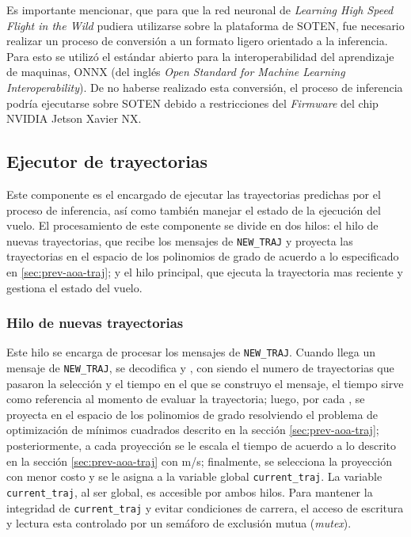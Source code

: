 Es importante mencionar, que para que la red neuronal de \textit{Learning High Speed Flight in the Wild} \cite{Loquercio2021} pudiera utilizarse sobre la plataforma de SOTEN, fue necesario realizar un proceso de conversión a un formato ligero orientado a la inferencia. Para esto se utilizó el estándar abierto para la interoperabilidad del aprendizaje de maquinas, ONNX \cite{onnx} (del inglés \textit{Open Standard for Machine Learning Interoperability}). De no haberse realizado esta conversión, el proceso de inferencia podría ejecutarse sobre SOTEN debido a restricciones del \textit{Firmware} del chip NVIDIA Jetson Xavier NX.

\subsection{Ejecutor de trayectorias}

Este componente es el encargado de ejecutar las trayectorias predichas por el proceso de inferencia, así como también manejar el estado de la ejecución del vuelo. El procesamiento de este componente se divide en dos hilos: el hilo de nuevas trayectorias, que recibe los mensajes de \texttt{NEW\_TRAJ} y proyecta las trayectorias en el espacio de los polinomios de grado  de acuerdo a lo especificado en \ref{sec:prev-aoa-traj}; y el hilo principal, que ejecuta la trayectoria mas reciente y gestiona el estado del vuelo.

\subsubsection{Hilo de nuevas trayectorias}

Este hilo se encarga de procesar los mensajes de \texttt{NEW\_TRAJ}. Cuando llega un mensaje de \texttt{NEW\_TRAJ}, se decodifica  y , con \jim{\beta} siendo el numero de trayectorias que pasaron la selección  y  el tiempo en el que se construyo el mensaje, el tiempo  sirve como referencia al momento de evaluar la trayectoria; luego, por cada , se proyecta  en el espacio de los polinomios de grado  resolviendo el problema de optimización de mínimos cuadrados descrito en la sección \ref{sec:prev-aoa-traj}; posteriormente, a cada proyección  se le escala el tiempo  de acuerdo a lo descrito en la sección \ref{sec:prev-aoa-traj} con  m/s; finalmente, se selecciona la proyección con menor costo  y se le asigna a la variable global \texttt{current\_traj}. La variable \texttt{current\_traj}, al ser global, es accesible por ambos hilos. Para mantener la integridad de \texttt{current\_traj} y evitar condiciones de carrera,  el acceso de escritura y lectura esta controlado por un semáforo de exclusión mutua (\textit{mutex}).


